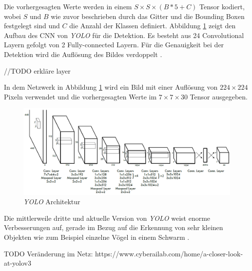 Die vorhergesagten Werte werden in einem $S \times S \times (B * 5 + C)$ Tensor kodiert, wobei $S$ und $B$ wie zuvor beschrieben durch das Gitter und die Bounding Boxen festgelegt sind und $C$ die Anzahl der Klassen definiert. Abbildung \ref{yolo_architecture} zeigt den Aufbau des CNN von \textit{YOLO} für die Detektion. Es besteht aus 24 Convolutional Layern gefolgt von 2 Fully-connected Layern. Für die Genauigkeit bei der Detektion wird die Auflösung des Bildes verdoppelt \cite{JosephRedmon.2016}. 

//TODO erkläre layer

In dem Netzwerk in Abbildung \ref{yolo_architecture} wird ein Bild mit einer Auflösung von $224 \times 224$ Pixeln verwendet und die vorhergesagten Werte im $7 \times 7 \times 30$ Tensor ausgegeben.

\begin{figure}[ht]
	\begin{center}
		\includegraphics[width=15cm]{Bilder/yolo_architecture.png} 
		\caption{\textit{YOLO} Architektur \cite{JosephRedmon.2016}}
		\label{yolo_architecture}
	\end{center}
\end{figure}

Die mittlerweile dritte und aktuelle Version von \textit{YOLO} weist enorme Verbesserungen auf, gerade im Bezug auf die Erkennung von sehr kleinen Objekten wie zum Beispiel einzelne Vögel in einem Schwarm \cite{JosephRedmon.2018}.

TODO Veränderung im Netz: https://www.cyberailab.com/home/a-closer-look-at-yolov3






